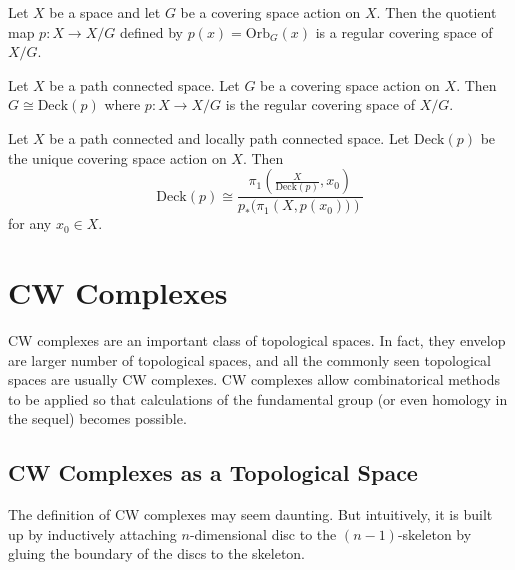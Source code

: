 \documentclass[a4paper]{article}
\begin{document}
\begin{prp}{}{} Let $X$ be a space and let $G$ be a covering space action on $X$. Then the quotient map $p:X\to X/G$ defined by $p(x)=\text{Orb}_G(x)$ is a regular covering space of $X/G$. 
\end{prp}

\begin{thm}{}{} Let $X$ be a path connected space. Let $G$ be a covering space action on $X$. Then $G\cong\text{Deck}(p)$ where $p:X\to X/G$ is the regular covering space of $X/G$. 
\end{thm}

\begin{crl}{}{} Let $X$ be a path connected and locally path connected space. Let $\text{Deck}(p)$ be the unique covering space action on $X$. Then $$\text{Deck}(p)\cong\frac{\pi_1\left(\frac{X}{\text{Deck}(p)},x_0\right)}{p_\ast(\pi_1\left(X,p(x_0))\right)}$$ for any $x_0\in X$. 
\end{crl}


\pagebreak
\section{CW Complexes}
CW complexes are an important class of topological spaces. In fact, they envelop are larger number of topological spaces, and all the commonly seen topological spaces are usually CW complexes. CW complexes allow combinatorical methods to be applied so that calculations of the fundamental group (or even homology in the sequel) becomes possible. 

\subsection{CW Complexes as a Topological Space}
The definition of CW complexes may seem daunting. But intuitively, it is built up by inductively attaching $n$-dimensional disc to the $(n-1)$-skeleton by gluing the boundary of the discs to the skeleton. 
\end{document}
